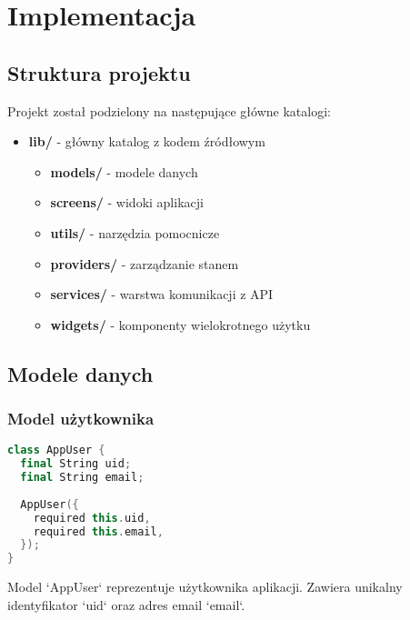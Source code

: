 \newpage
\section{Implementacja}		%

\subsection{Struktura projektu}

Projekt został podzielony na następujące główne katalogi:

\begin{itemize}
  \item \textbf{lib/} - główny katalog z kodem źródłowym
        \begin{itemize}
          \item \textbf{models/} - modele danych
          \item \textbf{screens/} - widoki aplikacji
          \item \textbf{utils/} - narzędzia pomocnicze
          \item \textbf{providers/} - zarządzanie stanem
          \item \textbf{services/} - warstwa komunikacji z API
          \item \textbf{widgets/} - komponenty wielokrotnego użytku
        \end{itemize}
\end{itemize}

\subsection{Modele danych}

\subsubsection{Model użytkownika}
\begin{lstlisting}[language=C++, caption=Model użytkownika, label={lst:user-model}]
class AppUser {
  final String uid;
  final String email;
  
  AppUser({
    required this.uid,
    required this.email,
  });
}
\end{lstlisting}
Model `AppUser` reprezentuje użytkownika aplikacji. Zawiera unikalny identyfikator `uid` oraz adres email `email`.
\newpage
